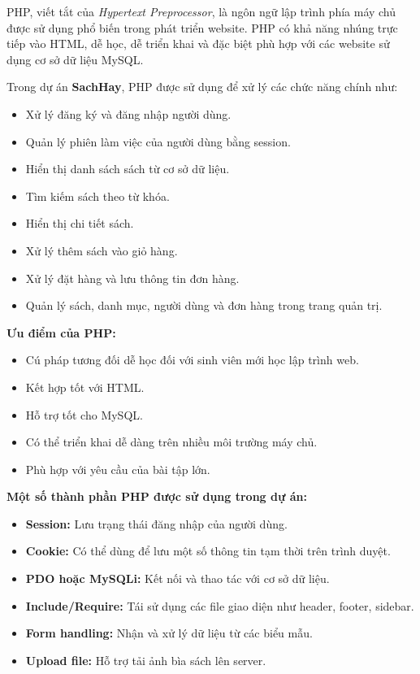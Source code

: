 PHP, viết tắt của \textit{Hypertext Preprocessor}, là ngôn ngữ lập trình phía máy chủ được sử dụng phổ biến trong phát triển website. PHP có khả năng nhúng trực tiếp vào HTML, dễ học, dễ triển khai và đặc biệt phù hợp với các website sử dụng cơ sở dữ liệu MySQL.

Trong dự án \textbf{SachHay}, PHP được sử dụng để xử lý các chức năng chính như:

\begin{itemize}
	\item Xử lý đăng ký và đăng nhập người dùng.
	\item Quản lý phiên làm việc của người dùng bằng session.
	\item Hiển thị danh sách sách từ cơ sở dữ liệu.
	\item Tìm kiếm sách theo từ khóa.
	\item Hiển thị chi tiết sách.
	\item Xử lý thêm sách vào giỏ hàng.
	\item Xử lý đặt hàng và lưu thông tin đơn hàng.
	\item Quản lý sách, danh mục, người dùng và đơn hàng trong trang quản trị.
\end{itemize}

\textbf{Ưu điểm của PHP:}

\begin{itemize}
	\item Cú pháp tương đối dễ học đối với sinh viên mới học lập trình web.
	\item Kết hợp tốt với HTML.
	\item Hỗ trợ tốt cho MySQL.
	\item Có thể triển khai dễ dàng trên nhiều môi trường máy chủ.
	\item Phù hợp với yêu cầu của bài tập lớn.
\end{itemize}

\textbf{Một số thành phần PHP được sử dụng trong dự án:}

\begin{itemize}
	\item \textbf{Session:} Lưu trạng thái đăng nhập của người dùng.
	\item \textbf{Cookie:} Có thể dùng để lưu một số thông tin tạm thời trên trình duyệt.
	\item \textbf{PDO hoặc MySQLi:} Kết nối và thao tác với cơ sở dữ liệu.
	\item \textbf{Include/Require:} Tái sử dụng các file giao diện như header, footer, sidebar.
	\item \textbf{Form handling:} Nhận và xử lý dữ liệu từ các biểu mẫu.
	\item \textbf{Upload file:} Hỗ trợ tải ảnh bìa sách lên server.
\end{itemize}

